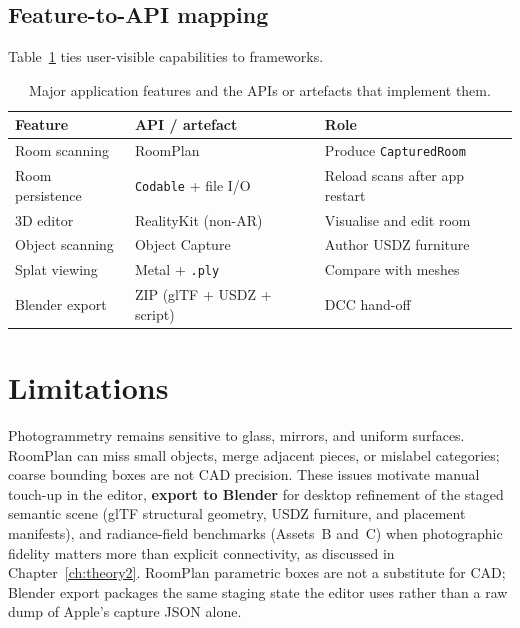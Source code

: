 \subsection{Feature-to-API mapping}

Table~\ref{tab:feature_api} ties user-visible capabilities to frameworks.

\begin{table}[h]
\centering
\caption{Major application features and the APIs or artefacts that implement them.}
\label{tab:feature_api}
\begin{tabular}{|l|l|p{}|}
\hline
\textbf{Feature} & \textbf{API / artefact} & \textbf{Role} \\
\hline
Room scanning & RoomPlan & Produce \texttt{CapturedRoom} \\
\hline
Room persistence & \texttt{Codable} + file I/O & Reload scans after app restart \\
\hline
3D editor & RealityKit (non-AR) & Visualise and edit room \\
\hline
Object scanning & Object Capture & Author USDZ furniture \\
\hline
Splat viewing & Metal + \texttt{.ply} & Compare with meshes \\
\hline
Blender export & ZIP (glTF + USDZ + script) & DCC hand-off \\
\hline
\end{tabular}
\end{table}

\section{Limitations}
\label{sec:limitations_capture}

Photogrammetry remains sensitive to glass, mirrors, and uniform surfaces. RoomPlan can miss small objects, merge adjacent pieces, or mislabel categories; coarse bounding boxes are not CAD precision. These issues motivate manual touch-up in the editor, \textbf{export to Blender} for desktop refinement of the staged semantic scene (glTF structural geometry, USDZ furniture, and placement manifests), and radiance-field benchmarks (Assets~B and~C) when photographic fidelity matters more than explicit connectivity, as discussed in Chapter~\ref{ch:theory2}. RoomPlan parametric boxes are not a substitute for CAD; Blender export packages the same staging state the editor uses rather than a raw dump of Apple's capture JSON alone.
